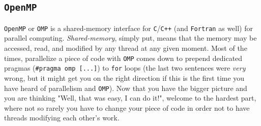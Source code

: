 \documentclass[a4paper,12pt,%
              final%
              ]{article}
\begin{document}
\subsection{\texttt{OpenMP}}
\texttt{OpenMP} or \texttt{OMP} is a shared-memory interface for \texttt{C}/\texttt{C++} (and \texttt{Fortran} as well) for parallel computing. \emph{Shared-memory}, simply put, means that the memory may be accessed, read, and modified by any thread at any given moment. Most of the times, parallelize a piece of code with \texttt{OMP} comes down to prepend dedicated pragmas (\verb|#pragma omp [...]|) to \texttt{for} loops (the last two sentences were \emph{very} wrong, but it might get you on the right direction if this is the first time you have heard of parallelism and \texttt{OMP}). Now that you have the bigger picture and you are thinking "Well, that was easy, I can do it!", welcome to the hardest part, where not so rarely you have to change your piece of code in order not to have threads modifying each other's work.
\end{document}
